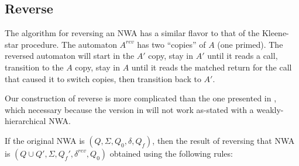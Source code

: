 
\subsection{Reverse}
\label{Se:Reverse}

The algorithm for reversing an NWA has a similar flavor to that of the
Kleene-star procedure. The automaton $A^{rev}$ has two ``copies'' of $A$ (one
primed). The reversed automaton will start in the $A'$ copy, stay in $A'$
until it reads a call, transition to the $A$ copy, stay in $A$ until it reads
the matched return for the call that caused it to switch copies, then
transition back to $A'$.

Our construction of reverse is more complicated than the one presented in
\cite{JACM:AM2009}, which necessary because the version in
\cite{JACM:AM2009} will not work as-stated with a weakly-hierarchical
NWA.

If the original NWA is $(Q, \Sigma, Q_0, \delta, Q_f)$, then the result of
reversing that NWA is $(Q \cup Q', \Sigma, Q_f', \delta^{rev}, Q_0)$ obtained using
the following rules:




